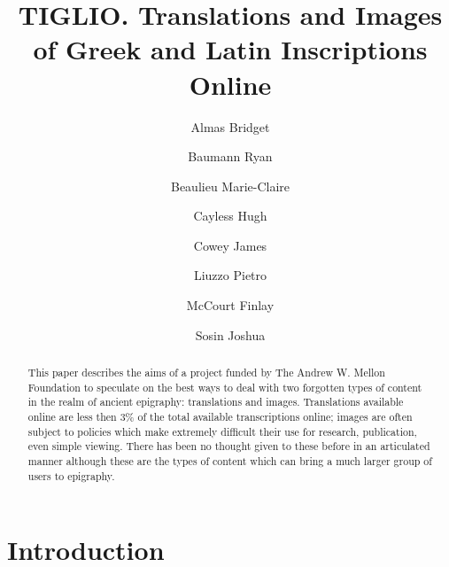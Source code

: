 \documentclass[amsthm,ebook]{saparticle}
\title{TIGLIO. Translations and Images of Greek and Latin Inscriptions Online}
\author[PERSEIDS]{Almas Bridget}
\author[DC3]{Baumann Ryan}
\author[PERSEIDS]{Beaulieu Marie-Claire}
\author[DC3]{Cayless Hugh}
\author[UHEI]{Cowey James}
\author[UHEI]{Liuzzo Pietro\corref{first}}
\author[AIO]{McCourt Finlay}
\author[DC3]{Sosin Joshua}
\begin{document}
\maketitle

\begin{abstract}
This paper describes the aims of a project funded by The Andrew W. Mellon Foundation to speculate on the best ways to deal with two forgotten types of content in the realm of ancient epigraphy: translations and images. Translations available online are less then 3\% of the total available transcriptions online; images are often subject to policies which make extremely difficult their use for research, publication, even simple viewing. There has been no thought given to these before in an articulated manner although these are the types of content which can bring a much larger group of users to epigraphy.   
\end{abstract}


\section{Introduction}\label{sec:intro}
\end{document}
